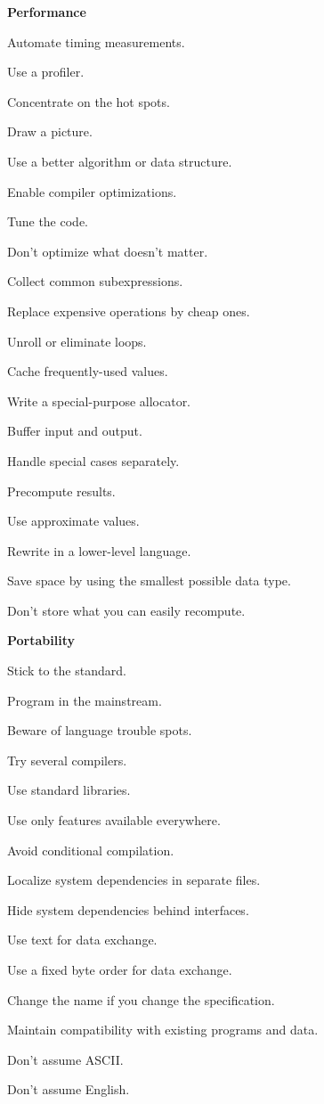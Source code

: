 {\Large\textbf{Performance}}
\begin{myitemize}
\item Automate timing measurements.
\item Use a profiler.
\item Concentrate on the hot spots.
\item Draw a picture.
\item Use a better algorithm or data structure.
\item Enable compiler optimizations.
\item Tune the code.
\item Don't optimize what doesn't matter.
\item Collect common subexpressions.
\item Replace expensive operations by cheap ones.
\item Unroll or eliminate loops.
\item Cache frequently-used values.
\item Write a special-purpose allocator.
\item Buffer input and output.
\item Handle special cases separately.
\item Precompute results.
\item Use approximate values.
\item Rewrite in a lower-level language.
\item Save space by using the smallest possible data type.
\item Don't store what you can easily recompute.
\end{myitemize}

{\Large\textbf{Portability}}
\begin{myitemize}
\item Stick to the standard.
\item Program in the mainstream.
\item Beware of language trouble spots.
\item Try several compilers.
\item Use standard libraries.
\item Use only features available everywhere.
\item Avoid conditional compilation.
\item Localize system dependencies in separate files.
\item Hide system dependencies behind interfaces.
\item Use text for data exchange.
\item Use a fixed byte order for data exchange.
\item Change the name if you change the specification.
\item Maintain compatibility with existing programs and data.
\item Don't assume ASCII.
\item Don't assume English.
\end{myitemize}
